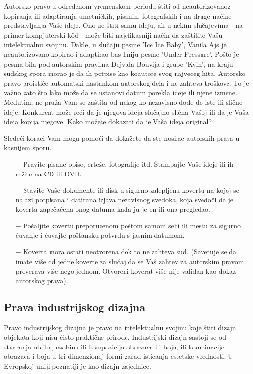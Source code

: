 \documentclass[a4paper]{article}
\begin{document}
Autorsko pravo u određenom vremenskom periodu štiti od neautorizovanog kopiranja ili adaptiranja umetničkih, pisanih, fotografskih i na druge načine predstavljanja Vaše ideje. Ono ne štiti samu ideju, ali u nekim slučajevima - na primer kompjuterski kôd - može biti najefikasniji način da zaštitite Vašu intelektualnu svojinu.
Dakle, u slučaju pesme 'Ice Ice Baby', Vanila Ajs je neautorizovano kopirao i adaptirao 
bas liniju pesme 'Under Pressure'. Pošto je pesma bila pod autorskim pravima Dejvida Bouvija i
grupe 'Kvin', na kraju sudskog spora morao je da ih potpise kao koautore svog najveceg hita.
Autorsko pravo proističe automatski nastankom autorskog dela i ne zahteva troškove. To je važno zato što lako može da se ustanovi datum porekla ideje ili njene izmene. Međutim, ne pruža Vam se zaštita od nekog ko nezavisno dođe do iste ili slične ideje. Konkurent može reći da je njegova ideja slučajno slična Vašoj ili da je Vaša ideja kopija njegove. Kako možete dokazati da je Vaša ideja original?

Sledeći koraci Vam mogu pomoći da dokažete da ste nosilac autorskih prava u kasnijem sporu.

\begin{itemize}
\item[$-$] Pravite pisane opise, crteže, fotografije itd. Štampajte Vaše ideje ili ih režite na CD ili DVD.
\item[$-$] Stavite Vaše dokumente ili disk u sigurno zalepljenu kovertu na kojoj se nalazi potpisana i datirana izjava nezavisnog svedoka, koja svedoči da je koverta zapečaćena onog datuma kada ju je on ili ona pregledao.
\item[$-$] Pošaljite kovertu preporučenom poštom samom sebi ili mestu za sigurno čuvanje i čuvajte poštansku potvrdu s jasnim datumom.
\item[$-$] Koverta mora ostati neotvorena dok to ne zahteva sud. (Savetuje se da imate više od jedne koverte za slučaj da se Vaš zahtev za autorskim pravom proverava više nego jednom. Otvoreni koverat više nije validan kao dokaz autorskog prava).
\end{itemize}

\subsection{Prava industrijskog dizajna}
\label{subsec:dizajn}

Pravo industrijskog dizajna je pravo na intelektualnu svojinu koje štiti dizajn objekata koji nisu čisto praktične prirode. Industrijski dizajn sastoji se od stvaranja oblika, osobina ili kompozicija obrazaca ili boja, ili kombinacije obrazaca i boja u tri dimenzionoj formi zarad isticanja estetske vrednosti. U Evropskoj uniji poznatiji je kao dizajn zajednice.
\end{document}
